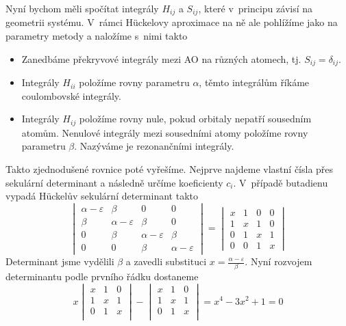 Nyní bychom měli spočítat integrály $H_{ij}$ a $S_{ij}$, které v~principu závisí na geometrii systému.
V~rámci H\"{u}ckelovy aproximace na ně ale pohlížíme jako na parametry metody
a naložíme s~nimi takto
\begin{itemize}
\item Zanedbáme překryvové integrály mezi AO na různých atomech, tj. $S_{ij}=\delta_{ij}$.
\item Integrály $H_{ii}$ položíme rovny parametru $\alpha$, těmto integrálům říkáme coulombovské integrály.
\item Integrály $H_{ij}$ položíme rovny nule, pokud orbitaly nepatří sousedním atomům.
Nenulové integrály mezi sousedními atomy položíme rovny parametru $\beta$. Nazýváme je rezonančními integrály.
\end{itemize}
Takto zjednodušené rovnice poté vyřešíme. Nejprve najdeme vlastní čísla přes sekulární determinant a následně určíme koeficienty $c_i$. V~případě butadienu vypadá H\"{u}ckelův sekulární determinant takto
\begin{equation}
\begin{vmatrix}
\alpha-\varepsilon & \beta & 0 & 0  \\
\beta &\alpha-\varepsilon & \beta & 0  \\
0 &\beta &\alpha-\varepsilon & \beta  \\
0 & 0 & \beta &\alpha-\varepsilon  
\end{vmatrix}
= 
\begin{vmatrix}
x & 1 & 0 & 0  \\
1 & x & 1 & 0  \\
0 & 1 & x & 1  \\
0 & 0 & 1 & x  
\end{vmatrix}
\end{equation}
Determinant jsme vydělili $\beta$ a zavedli substituci $x=\frac{\alpha-\varepsilon}{\beta}$.
Nyní rozvojem determinantu podle prvního řádku dostaneme
\begin{equation}
x
\begin{vmatrix}
x & 1 & 0 \\
1 & x & 1 \\
0 & 1 & x \\
\end{vmatrix}
-
\begin{vmatrix}
x & 1 & 0 \\
1 & x & 1 \\
0 & 1 & x \\
\end{vmatrix}
=x^4-3x^2+1=0  
\end{equation}

